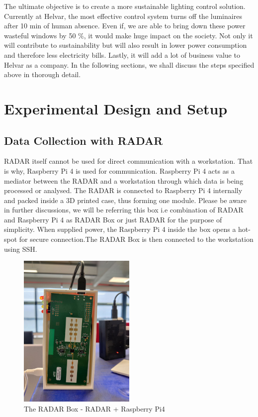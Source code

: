 The ultimate objective is to create a more sustainable lighting control solution. Currently at Helvar, the most effective control system turns off the luminaires after 10 min of human absence. Even if, we are able to bring down these power wasteful windows by 50 \%, it would make huge impact on the society. Not only it will contribute to sustainability but will also result in lower power consumption and therefore less electricity bills. Lastly, it will add a lot of business value to Helvar as a company. In the following sections, we shall discuss the steps specified above in thorough detail.

\section{Experimental Design and Setup}

\subsection{Data Collection with RADAR}
RADAR itself cannot be used for direct communication with a workstation. That is why, Raspberry Pi 4 is used for communication. Raspberry Pi 4 acts as a mediator between the RADAR and a workstation through which data is being processed or analysed. 
The RADAR is connected to Raspberry Pi 4 internally and packed inside a 3D printed case, thus forming one module. Please be aware in further discussions, we will be referring this box i.e combination of RADAR and Raspberry Pi 4 as RADAR Box or just RADAR for the purpose of simplicity. When supplied power, the Raspberry Pi 4 inside the box opens a hot-spot for secure connection.The RADAR Box is then connected to the workstation using SSH. 

\begin{figure}[ht]
  \begin{center}
    \includegraphics[width=0.5\textwidth]{Master's thesis/images/RADAR_int.jpg} 
    \caption{The RADAR Box - RADAR + Raspberry Pi4 }
    \label{fig:AoA}
  \end{center}
\end{figure}  

